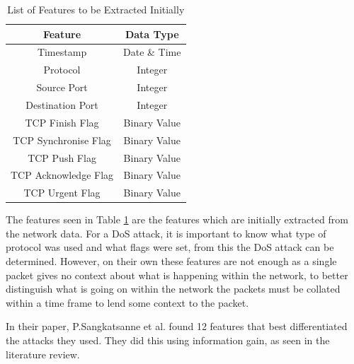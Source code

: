 \begin{table}[H]
 \centering
 \caption{List of Features to be Extracted Initially}
 \label{table:features_init}
 \begin{tabular}{|c|c|}
 \hline
 \textbf{Feature}&\textbf{Data Type}\\
 \hline
 Timestamp & Date \& Time \\
 \hline
 Protocol & Integer\\ 
 \hline
 Source Port & Integer\\
 \hline
 Destination Port & Integer\\
 \hline
 TCP Finish Flag & Binary Value\\
 \hline
 TCP Synchronise Flag & Binary Value\\
 \hline
 TCP Push Flag & Binary Value\\
 \hline
 TCP Acknowledge Flag & Binary Value\\
 \hline
 TCP Urgent Flag & Binary Value\\
 \hline
\end{tabular}
\end{table}

The features seen in Table \ref{table:features_init} are the features which are initially extracted from the network data. For a DoS attack, it is important to know what type of protocol was used and what flags were set, from this the DoS attack can be determined. However, on their own these features are not enough as a single packet gives no context about what is happening within the network, to better distinguish what is going on within the network the packets must be collated within a time frame to lend some context to the packet.

In their paper, P.Sangkatsanne et al. \cite{SANGKATSANEE20112227} found 12 features that best differentiated the attacks they used. They did this using information gain, as seen in the literature review.

